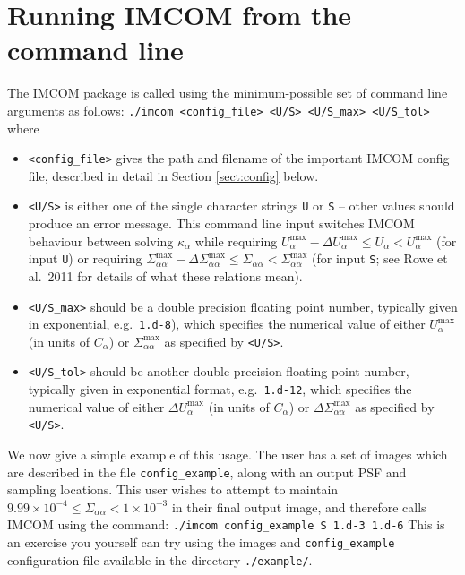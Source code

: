 \documentclass[10pt]{article}
\begin{document}
\section{Running IMCOM from the command line}
The IMCOM package is called using the minimum-possible set of command line arguments as follows:
\newline
\newline
\indent \texttt{./imcom <config\_file> <U/S> <U/S\_max> <U/S\_tol>}
\newline
\newline
where
\begin{itemize}
\item \texttt{<config\_file>} gives the path and filename of the important IMCOM config file, described in detail in Section \ref{sect:config} below.

\item \texttt{<U/S>} is either one of the single character strings \texttt{U} or \texttt{S} -- other values should produce an error message.  This command line input switches IMCOM behaviour between solving $\kappa_{\alpha}$ while requiring $U_{\alpha}^{\textrm{max}} - \Delta U_{\alpha}^{\textrm{max}} \le U_{\alpha} < U_{\alpha}^{\textrm{max}}$ (for input \texttt{U}) or requiring $ \Sigma_{\alpha \alpha}^{\textrm{max}} - \Delta \Sigma_{\alpha \alpha}^{\textrm{max}} \le \Sigma_{\alpha \alpha} < \Sigma_{\alpha \alpha}^{\textrm{max}}$ (for input \texttt{S}; see Rowe et al.\ 2011 for details of what these relations mean).

\item \texttt{<U/S\_max>} should be a double precision floating point number, typically given in exponential, e.g.\ \texttt{1.d-8}), which specifies the numerical value of either $U_{\alpha}^{\textrm{max}}$ (in units of $C_{\alpha}$) or $\Sigma_{\alpha \alpha}^{\textrm{max}}$ as specified by \texttt{<U/S>}.

\item \texttt{<U/S\_tol>} should be another double precision floating point number, typically given in exponential format, e.g.\ \texttt{1.d-12}, which specifies the numerical value of either $\Delta U_{\alpha}^{\textrm{max}}$ (in units of $C_{\alpha}$) or $\Delta \Sigma_{\alpha \alpha}^{\textrm{max}}$ as specified by \texttt{<U/S>}.
\end{itemize}

We now give a simple example of this usage. The user has a set of images which are described in the file \texttt{config\_example}, along with an output PSF and sampling locations.  This user wishes to attempt to maintain $9.99 \times 10^{-4} \le \Sigma_{\alpha \alpha} < 1 \times 10^{-3}$ in their final output image, and therefore calls IMCOM using the command:
\newline
\newline
\texttt{./imcom config\_example S 1.d-3 1.d-6}
\newline
\newline
This is an exercise you yourself can try using the images and \texttt{config\_example} configuration file available in the directory \texttt{./example/}.
\end{document}
